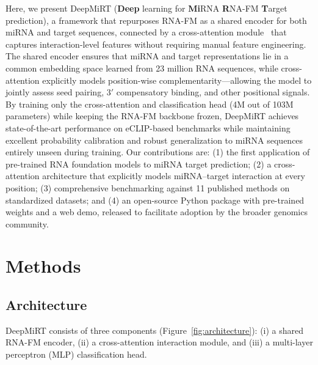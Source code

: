 \documentclass[10pt,a4paper]{article}
\begin{document}
Here, we present DeepMiRT (\textbf{Deep} learning for \textbf{Mi}RNA \textbf{R}NA-FM \textbf{T}arget prediction), a framework that repurposes RNA-FM as a shared encoder for both miRNA and target sequences, connected by a cross-attention module~\citep{vaswani2017attention} that captures interaction-level features without requiring manual feature engineering. The shared encoder ensures that miRNA and target representations lie in a common embedding space learned from 23 million RNA sequences, while cross-attention explicitly models position-wise complementarity---allowing the model to jointly assess seed pairing, 3$'$ compensatory binding, and other positional signals. By training only the cross-attention and classification head (4M out of 103M parameters) while keeping the RNA-FM backbone frozen, DeepMiRT achieves state-of-the-art performance on eCLIP-based benchmarks while maintaining excellent probability calibration and robust generalization to miRNA sequences entirely unseen during training. Our contributions are: (1) the first application of pre-trained RNA foundation models to miRNA target prediction; (2) a cross-attention architecture that explicitly models miRNA--target interaction at every position; (3) comprehensive benchmarking against 11 published methods on standardized datasets; and (4) an open-source Python package with pre-trained weights and a web demo, released to facilitate adoption by the broader genomics community.

\section{Methods}

\subsection{Architecture}

DeepMiRT consists of three components (Figure~\ref{fig:architecture}): (i) a shared RNA-FM encoder, (ii) a cross-attention interaction module, and (iii) a multi-layer perceptron (MLP) classification head.
\end{document}
